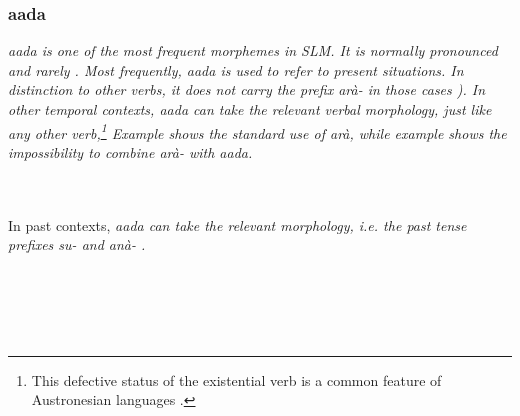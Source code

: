 \subsubsection{aada}\label{sec:wc:Existentialverbs:aada}
\em aada \em is one of the most frequent morphemes in SLM. It is normally pronounced  and rarely . Most frequently, \em aada \em is used to refer to present situations. In distinction to other verbs, it does not carry the  prefix \em arà- \em in those cases \citep[cf.][169]{SmithEtAl2007}). In other temporal contexts, \em aada \em can take the relevant verbal morphology, just like any other verb,\footnote{This defective status of the existential verb is a common feature of Austronesian languages \citep[138]{Himmelmann2005typochar}.} Example  shows the standard use of \em arà\em, \em while example  shows the impossibility to combine \em arà- \em with  \em aada.


 \\
 \\

In past contexts, \em aada \em can take the relevant morphology, i.e. the past tense prefixes \em su- \em {} and \em anà- \em {}.

\\


 \\
 \\

